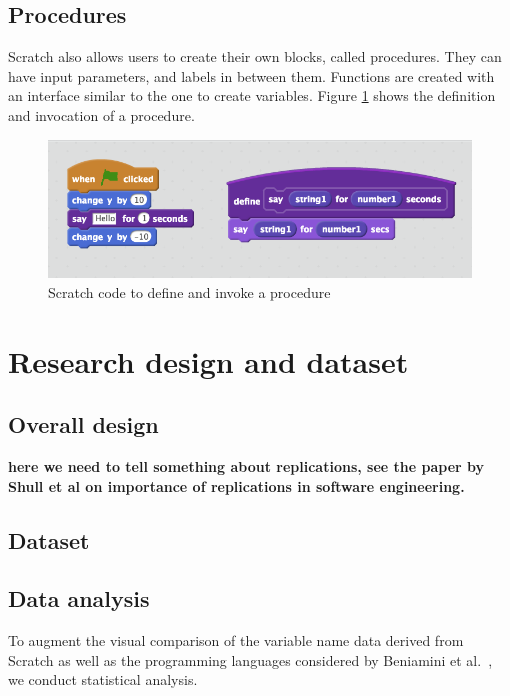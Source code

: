 \documentclass[conference]{IEEEtran}
\newcommand{\todo}[1]{ \textbf{#1} }
\begin{document}
\subsection{Procedures}
Scratch also allows users to create their own blocks, called procedures. They can have input parameters, and labels in between them. Functions are created with an interface similar to the one to create variables. Figure \ref{fig:functions} shows the definition and invocation of a procedure.

\begin{figure}
  \begin{center}
  \includegraphics[width=\columnwidth]{fig/functions.png}
  \caption{Scratch code to define and invoke a procedure}
  \label{fig:functions}
  \end{center}
\end{figure} 


\section{Research design and dataset}
\subsection{Overall design}
\todo{here we need to tell something about replications, see the paper by Shull et al on importance of replications in software engineering.}

\subsection{Dataset}


\subsection{Data analysis}
To augment the visual comparison of the variable name data derived from Scratch as well as the programming languages considered by Beniamini et al.~\cite{Beniamini}, we conduct statistical analysis. 
\end{document}
